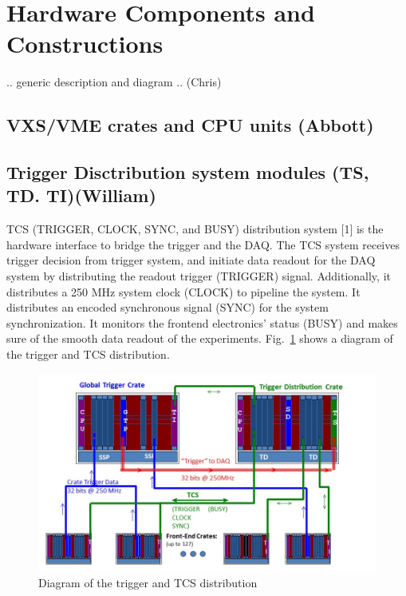 \section{Hardware Components and Constructions}

.. generic description and diagram .. (Chris)

\subsection{VXS/VME crates and CPU units (Abbott)}

\subsection{Trigger Disctribution system modules (TS, TD. TI)(William)}
	
TCS (TRIGGER, CLOCK, SYNC, and BUSY) distribution system [1] is the hardware interface to bridge the trigger and the DAQ.  The TCS system receives trigger decision from trigger system, and initiate data readout for the DAQ system by distributing the readout trigger (TRIGGER) signal.  Additionally, it distributes a 250 MHz system clock (CLOCK) to pipeline the system.  It distributes an encoded synchronous signal (SYNC) for the system synchronization.  It monitors the frontend electronics’ status (BUSY) and makes sure of the smooth data readout of the experiments. Fig.~\ref{fig:TCSdiagram} shows a diagram of the trigger and TCS distribution.

\begin{figure}[hbt]
	\centering
	\includegraphics[width=1.0\columnwidth,keepaspectratio]{img/TCSdiagram.jpg}
	\caption{Diagram of the trigger and TCS distribution}
	\label{fig:TCSdiagram}
\end{figure}


